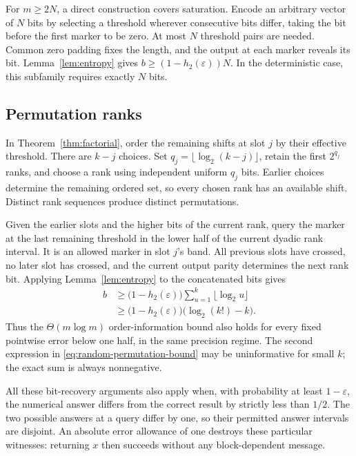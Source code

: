 \documentclass[11pt,reqno]{amsart}
\theoremstyle{definition}
\theoremstyle{remark}
\numberwithin{equation}{section}
\begin{document}
For $m\geq 2N$, a direct construction covers saturation. Encode an
arbitrary vector of $N$ bits by selecting a threshold wherever
consecutive bits differ, taking the bit before the first marker to
be zero. At most $N$ threshold pairs are needed. Common zero padding
fixes the length, and the output at each marker reveals its bit.
Lemma~\ref{lem:entropy} gives
$b\geq(1-h_2(\varepsilon))N$. In the deterministic case, this
subfamily requires exactly $N$ bits.

\subsection{Permutation ranks}
\label{subsec:random-permutations}

In Theorem~\ref{thm:factorial}, order the remaining shifts at slot $j$
by their effective threshold. There are $k-j$ choices. Set
$q_j=\lfloor\log_2(k-j)\rfloor$, retain the first $2^{q_j}$ ranks,
and choose a rank using independent uniform $q_j$ bits. Earlier
choices determine the remaining ordered set, so every chosen rank
has an available shift. Distinct rank sequences produce distinct
permutations.

Given the earlier slots and the higher bits of the current rank,
query the marker at the last remaining threshold in the lower half
of the current dyadic rank interval. It is an allowed marker in
slot $j$'s band. All previous slots have crossed, no later slot has
crossed, and the current output parity determines the next rank bit.
Applying Lemma~\ref{lem:entropy} to the concatenated bits gives
\begin{equation}
\label{eq:random-permutation-bound}
\begin{aligned}
 b&\geq\bigl(1-h_2(\varepsilon)\bigr)
          \sum_{u=1}^k\lfloor\log_2 u\rfloor\\
  &\geq\bigl(1-h_2(\varepsilon)\bigr)\bigl(\log_2(k!)-k\bigr).
\end{aligned}
\end{equation}
Thus the $\Theta(m\log m)$ order-information bound also holds for
every fixed pointwise error below one half, in the same precision
regime. The second expression in \eqref{eq:random-permutation-bound}
may be uninformative for small $k$; the exact sum is always
nonnegative.

All these bit-recovery arguments also apply when, with probability
at least $1-\varepsilon$, the numerical answer differs from the
correct result by strictly less than $1/2$. The two possible answers
at a query differ by one, so their permitted answer intervals are
disjoint. An absolute error allowance of one destroys these
particular witnesses: returning $x$ then succeeds without any
block-dependent message.
\end{document}
